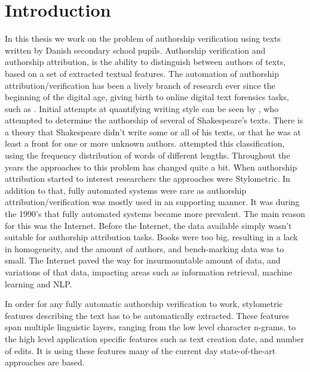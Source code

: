 \section{Introduction} \label{sec:introduction}


In this thesis we work on the problem of authorship verification using texts
written by Danish secondary school pupils. Authorship verification and
authorship attribution, is the ability to distinguish between authors of texts,
based on a set of extracted textual features. The automation of authorship
attribution/verification has been a lively branch of research ever since the
beginning of the digital age, giving birth to online digital text forensics
tasks, such as \cite{pan:2015}. Initial attempts at quantifying writing style
can be seen by \cite{Mendenhall237}, who attempted to determine the authorship
of several of Shakespeare's texts. There is a theory that Shakespeare didn't
write some or all of his texts, or that he was at least a front for one or more
unknown authors. \cite{Mendenhall237} attempted this classification, using the
frequency distribution of words of different lengths. Throughout the years the
approaches to this problem has changed quite a bit. When authorship attribution
started to interest researchers the approaches were Stylometric. In addition to
that, fully automated systems were rare as authorship attribution/verification
was mostly used in an supporting manner. It was during the 1990's that fully
automated systems became more prevalent. The main reason for this was the
Internet. Before the Internet, the data available simply wasn't suitable for
authorship attribution tasks. Books were too big, resulting in a lack in
homogeneity, and the amount of authors, and bench-marking data was to small.
The Internet paved the way for insurmountable amount of data, and variations of
that data, impacting areas such as information retrieval, machine learning and
\gls{NLP}.

In order for any fully automatic authorship verification to work, stylometric
features describing the text has to be automatically extracted. These features
span multiple linguistic layers, ranging from the low level character n-grams,
to the high level application specific features such as text creation date,
and number of edits. It is using these features many of the current day
state-of-the-art approaches are based.

